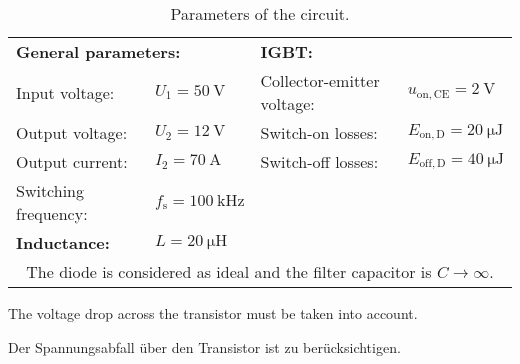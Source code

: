 \begin{table}[ht]
    \centering  %
    \begin{tabular}{llll}
        \toprule
        \multicolumn{2}{l}{\textbf{General parameters:}} & \multicolumn{2}{l}{\textbf{IGBT:}} \\ 
        Input voltage: &  $U_{\mathrm{1}} = \SI{50}{\volt}$ & Collector-emitter voltage: & $u_{\mathrm{on},\mathrm{CE}} = \SI{2}{\volt}$ \\
        Output voltage: & $U_2 = \SI{12}{\volt}$  & Switch-on losses: & $E_{\text{on},\mathrm{D}} = \SI{20}{\micro\joule}$ \\
        Output current: & $I_2 = \SI{70}{\ampere}$  & Switch-off losses: &  $E_{\text{off},\mathrm{D}} = \SI{40}{\micro\joule}$ \\
        Switching frequency: & $f_\mathrm{s} = \SI{100}{\kilo\hertz}$  & &  \\
        \midrule
        \textbf{Inductance:} & $L = \SI{20}{\micro\henry}$ & & \\
        \multicolumn{4}{c}{The diode is considered as ideal and the filter capacitor is $C \rightarrow \infty$.}  \\ 
        \bottomrule
    \end{tabular}
    \caption{Parameters of the circuit.}  %
    \label{table:ex01_Parameters of the circuit}
\end{table}

%
\begin{hintblock}
    The voltage drop across the transistor must be taken into account.
\end{hintblock}

\begin{germanhintblock}
    Der Spannungsabfall über den Transistor ist zu berücksichtigen.
\end{germanhintblock}

